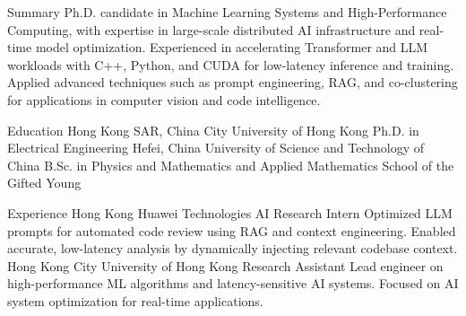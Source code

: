 \documentclass[caps, english]{financecv}
\begin{document}
\begin{cvsection}{Summary}
    Ph.D. candidate in Machine Learning Systems and High-Performance Computing, with expertise in large-scale distributed AI infrastructure and real-time model optimization. Experienced in accelerating Transformer and LLM workloads with C++, Python, and CUDA for low-latency inference and training. Applied advanced techniques such as prompt engineering, RAG, and co-clustering for applications in computer vision and code intelligence.
\end{cvsection}

\begin{cvsection}{Education}
    {Hong Kong SAR, China}
    {City University of Hong Kong}
    {}
    {Ph.D. in Electrical Engineering}
    {}
    {}
    {}
    {Hefei, China}
    {University of Science and Technology of China}
    {}
    {B.Sc. in Physics and Mathematics and Applied Mathematics}
    {School of the Gifted Young}
    {}
    {}
\end{cvsection}

\begin{cvsection}{Experience}
    {Hong Kong}
    {Huawei Technologies}
    {AI Research Intern}
    {Optimized LLM prompts for automated code review using RAG and context engineering. Enabled accurate, low-latency analysis by dynamically injecting relevant codebase context.}
    {}
    {}
    {}
    {Hong Kong}
    {City University of Hong Kong}
    {Research Assistant}
    {Lead engineer on high-performance ML algorithms and latency-sensitive AI systems. Focused on AI system optimization for real-time applications.}
    {}
    {}
    {}
\end{cvsection}
\end{document}
